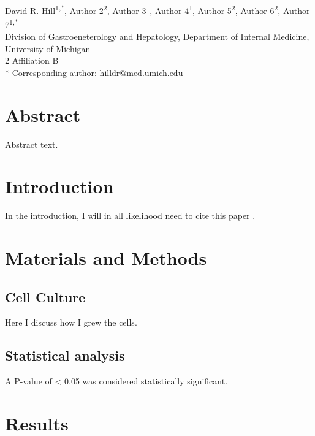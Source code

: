 \documentclass[11pt]{article}
\author{David R. Hill}
\date{\today}
\title{}
\begin{document}
\begin{flushleft}
{\huge
  \textbf{
    }
  }
\newline
\\
David R. Hill\textsuperscript{1,*},
Author 2\textsuperscript{2},
Author 3\textsuperscript{1},
Author 4\textsuperscript{1},
Author 5\textsuperscript{2},
Author 6\textsuperscript{2},
Author 7\textsuperscript{1,*}
\\
 Division of Gastroeneterology and Hepatology, Department of Internal Medicine, University of Michigan
\\
2 Affiliation B
\\
\bigskip
$\ast$ Corresponding author: hilldr@med.umich.edu

\end{flushleft}

\section*{{\bfseries\sffamily } Abstract}
\label{sec:org797cb99}
Abstract text. \lipsum[4]
\section*{{\bfseries\sffamily } Introduction}
\label{sec:orgf45a75d}
In the introduction, I will in all likelihood need to cite this paper \cite{Hill:2017}. \lipsum
\section*{{\bfseries\sffamily } Materials and Methods}
\label{sec:org58380cd}
\subsection*{{\bfseries\sffamily } Cell Culture}
\label{sec:org37dcf96}
Here I discuss how I grew the cells. \lipsum[2]
\subsection*{{\bfseries\sffamily } Statistical analysis}
\label{sec:org81cf2eb}
A P-value of < 0.05 was considered statistically significant. \lipsum[3]
\section*{{\bfseries\sffamily } Results}
\label{sec:org116bd85}
\end{document}
